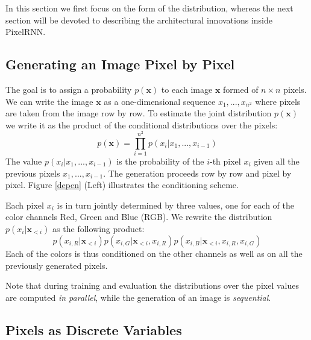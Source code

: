 \documentclass{article}
\renewcommand{\vec}{\mathbf}
\begin{document}
In this section we first focus on the form of the distribution,
whereas the next section will be devoted to describing the architectural innovations inside PixelRNN.


\subsection{Generating an Image Pixel by Pixel}

The goal is to assign a probability $p(\vec{x})$ to each image $\vec{x}$ formed of $n \times n$ pixels. We can write the image $\vec{x}$ as a one-dimensional sequence $x_1,...,x_{n^2}$ where pixels are taken from the image row by row. To estimate the joint distribution $p(\vec{x})$ we write it as the product of the conditional distributions over the pixels:
\vspace{-0.3cm}
\begin{equation}
p(\vec{x}) = \prod_{i=1}^{n^2} p(x_i | x_1,...,x_{i-1})
\end{equation}
The value $p(x_i | x_1,...,x_{i-1})$ is the probability of the $i$-th pixel $x_i$ given all the previous pixels $x_1,...,x_{i-1}$. The generation proceeds row by row and pixel by pixel. Figure \ref{depen} (Left) illustrates the conditioning scheme.


Each pixel $x_i$ is in turn jointly determined by three values, one for each of the color channels Red, Green and Blue (RGB). We rewrite the distribution $p(x_i|\vec{x}_{<i})$ as the following product:
\begin{equation}
p(x_{i,R}|\vec{x}_{<i})p(x_{i,G}|\vec{x}_{<i},x_{i,R})p(x_{i,B}|\vec{x}_{<i},x_{i,R},x_{i,G})
\label{eq:color_conditioning}
\end{equation} 
Each of the colors is thus conditioned on the other channels as well as on all the previously generated pixels. 

Note that during {training} and evaluation the distributions over the pixel values are computed \emph{in parallel}, while the generation of an image is \emph{sequential}. 

\subsection{Pixels as Discrete Variables}
\end{document}
